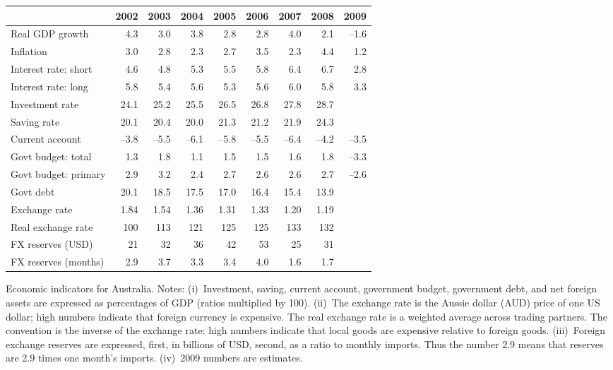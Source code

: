 \documentclass[letterpaper,12pt]{exam}
\begin{document}
\begin{questions}
%
\begin{center}
{\small
\begin{tabular}{lrrrrrrrr}%
\toprule
    & 2002 & 2003 & 2004 & 2005 & 2006 &  2007 &  2008 & 2009 \\%
\midrule
Real GDP growth  & 4.3 & 3.0 & 3.8 & 2.8 & 2.8 & 4.0 & 2.1
        & --1.6 \\
Inflation
        & 3.0 & 2.8 & 2.3 & 2.7 & 3.5 & 2.3 & 4.4 & 1.2 \\
Interest rate:  short
        & 4.6 & 4.8 & 5.3 & 5.5 & 5.8 & 6.4 & 6.7 & 2.8 \\
Interest rate:  long
        & 5.8 & 5.4 & 5.6 & 5.3 & 5.6 & 6.0 & 5.8 & 3.3 \\
Investment rate
        & 24.1 & 25.2 & 25.5 & 26.5 & 26.8 & 27.8 & 28.7 &  \\
Saving rate
        & 20.1 & 20.4 & 20.0 & 21.3 & 21.2 & 21.9 & 24.3 &  \\
Current account
        & --3.8 & --5.5 & --6.1 & --5.8 & --5.5
        & --6.4 & --4.2 & --3.5 \\
Govt budget:  total
        & 1.3 & 1.8 & 1.1 & 1.5 & 1.5 & 1.6 & 1.8 & --3.3 \\
Govt budget:  primary
        & 2.9 & 3.2 & 2.4 & 2.7 & 2.6 & 2.6 & 2.7 & --2.6 \\
Govt debt
        & 20.1 & 18.5 & 17.5 & 17.0 & 16.4 & 15.4 & 13.9  \\
Exchange rate
        & 1.84 & 1.54 & 1.36 & 1.31 & 1.33 & 1.20 & 1.19 \\
Real exchange rate
        & 100 &  113 & 121 & 125 & 125 & 133 & 132 \\
FX reserves (USD)
        & 21 & 32 & 36 & 42 & 53 & 25 & 31 & \\
FX reserves (months)
        &  2.9 & 3.7 & 3.3 & 3.4 & 4.0 & 1.6 & 1.7 \\
\bottomrule
\end{tabular}
}
\end{center}
{Economic indicators for Australia.
Notes:
(i)~Investment, saving, current account, government budget,
government debt, and net foreign assets
are expressed as percentages of GDP (ratios multiplied by 100).
(ii)~The exchange rate is the Aussie dollar (AUD) price
of one US dollar;
high numbers indicate that foreign currency is expensive.
The real exchange rate is a weighted average across trading partners.
The convention is the inverse of the exchange rate:
high numbers indicate that local goods are expensive relative to foreign
goods.
(iii)~Foreign exchange reserves are expressed, first,
in billions of USD, second,
as a ratio to monthly imports.
Thus the number 2.9 means that reserves are 2.9 times one
month's imports.
(iv)~2009 numbers are estimates.}


\end{questions}
\end{document}
